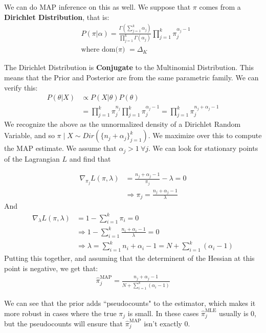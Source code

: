 \documentclass[]{article}
\theoremstyle{mattstyle}
\theoremstyle{definition}
\begin{document}
We can do MAP inference on this as well. We suppose that $\pi$ comes from a \textbf{Dirichlet Distribution}, that is:
\begin{align*}
&P(\pi|\alpha)=\frac{\Gamma\left(\sum_{j=1}^{k}\alpha_j\right)}{\prod_{j=1}^{k}\Gamma(\alpha_j)}\prod_{j=1}^{k}\pi_{j}^{\alpha_j-1}\\
&\text{where dom($\pi$) $=\Delta_K$}
\end{align*}

The Dirichlet Distribution is \textbf{Conjugate} to the Multinomial Distribution. This means that the Prior and Posterior are from the same parametric family. We can verify this:
\begin{align*}
P(\theta|X)&\propto P(X|\theta)P(\theta)\\
&= \prod_{j=1}^{k}\pi_{j}^{n_j}\prod_{j=1}^{k}\pi_{j}^{\alpha_j-1} = \prod_{j=1}^{k}\pi_{j}^{n_j + \alpha_j-1}
\end{align*}
We recognize the above as the unnormalized density of a Dirichlet Random Variable, and so $\pi \mid X \sim Dir\left(\{n_j + \alpha_j\}_{j=1}^k\right)$.
We maximize over this to compute the MAP estimate. We assume that $\alpha_j > 1 \ \forall j$. We can look for stationary points of the Lagrangian $L$ and find that

\begin{align*}
\nabla_{\pi_j} L(\pi, \lambda) &= \frac{n_j + \alpha_j -1}{\pi_j} - \lambda = 0 \\
&\Rightarrow \pi_j = \frac{n_j + \alpha_j -1}{\lambda}
\end{align*}
And
\begin{align*}
\nabla_{\lambda} L(\pi, \lambda) &= 1 - \sum_{i=1}^k \pi_i = 0 \\
&\Rightarrow 1 - \sum_{i=1}^k \frac{n_i + \alpha_i -1}{\lambda} = 0 \\
&\Rightarrow \lambda = \sum_{i=1}^k n_i + \alpha_i -1 = N + \sum_{i=1}^k (\alpha_i - 1)
\end{align*}
Putting this together, and assuming that the determinent of the Hessian at this point is negative, we get that:
\begin{align*}
\boxed{\hat{\pi}_{j}^{\text{MAP}} = \frac{n_j + \alpha_j -1}{N + \sum_{i=1}^k (\alpha_i - 1)}}
\end{align*}

We can see that the prior adds ``pseudocounts" to the estimator, which makes it more robust in cases where the true $\pi_j$ is small. In these cases $\hat{\pi}_{j}^{\text{MLE}}$ usually is $0$, but the pseudocounts will ensure that $\hat{\pi}_{j}^{\text{MAP}}$ isn't exactly 0.
\end{document}
